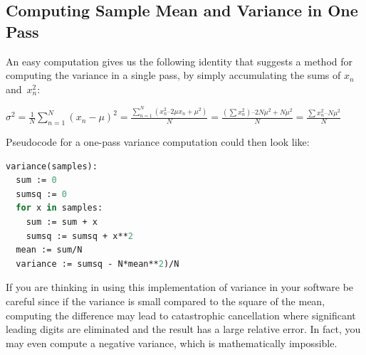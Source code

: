 \documentclass[12pt]{article} %
\begin{document}
\begin{appendices}
\section{Computing Sample Mean and Variance in One Pass}
\label{app:variance}

An easy computation gives us the following identity that suggests a method for computing the variance in a single pass, by simply accumulating the sums of $x_n$ and~$x^2_n$:

$\sigma^2 
={ {{\frac {1}{N}}\sum _{n=1}^{N}\left(x_n-{\mu}\right)^{2}}} =
\frac{\sum_{n=1}^N (x_n^2 – 2\mu x_n + \mu^2)}{N} = \frac{(\sum x_n^2) – 2 N \mu^2 + N \mu^2}{N} = \frac{\sum x_n^2 – N \mu^2}{N}$

Pseudocode for a one-pass variance computation could then look like:


\begin{lstlisting}[language=Pascal]
variance(samples):
  sum := 0
  sumsq := 0
  for x in samples:
    sum := sum + x
    sumsq := sumsq + x**2
  mean := sum/N 
  variance := sumsq - N*mean**2)/N
\end{lstlisting}

If you are thinking in using this implementation of variance in your software be careful since if the variance is small compared to the square of the mean, computing the difference may lead to catastrophic cancellation where significant leading digits are eliminated and the result has a large relative error. In fact, you may even compute a negative variance, which is mathematically impossible.

\end{appendices}
\end{document}
